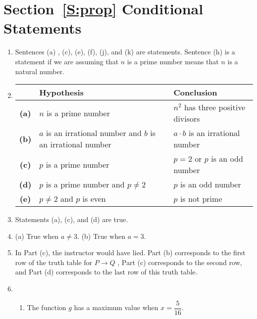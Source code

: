 \section*{Section~\ref{S:prop} Conditional Statements}
\noindent

\begin{enumerate}
\item Sentences (a) , (c), (e), (f), (j), and  (k) are statements.  Sentence (h) is a statement if we are assuming that $n$ is a prime number means that  $n$ is a natural number.



\item
\begin{tabular}[t]{| c | p{2.0in} | p{2.0in} |} \hline
  &  Hypothesis  &  Conclusion \\ \hline
\bf{(a)}  &  $n$ is a prime number  &  $n^2$ has three positive divisors \\ \hline
\bf{(b)}  &  $a$ is an irrational number and $b$ is an irrational number  &  $a \cdot b$ is an irrational number \\ \hline
\bf{(c)}  &  $p$ is a prime number  &  $p = 2$ or $p$ is an odd number  \\ \hline
\bf{(d)}  &  $p$ is a prime number and $p \ne 2$  &  $p$ is an odd number \\ \hline
\bf{(e)}  &  $p \ne 2$ and $p$ is even  &  $p$ is not prime \\  \hline
\end{tabular}

\item Statements (a), (c), and (d) are true.

\item (a) True when $a \ne 3$.  (b) True when $a= 3$.


\item In Part (c), the instructor would have lied.  Part (b) corresponds to the first row of the truth table for $P \to Q$ , Part (c) corresponds to the second row, and Part (d) corresponds to the last row of this truth table.


\item \begin{enumerate} 
\item The function $g$ has a maximum value when $x = \dfrac{5}{16}$.


\end{enumerate}
\end{enumerate}
